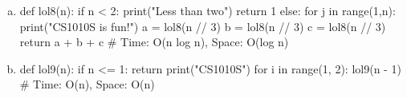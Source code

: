 \begin{enumerate}[(a)]
\item
\begin{python}
def lol8(n):
    if n < 2:
        print("Less than two")
        return 1
    else:
        for j in range(1,n):
            print("CS1010S is fun!")
        a = lol8(n // 3)
        b = lol8(n // 3)
        c = lol8(n // 3)
        return a + b + c
# Time: O(n log n), Space: O(log n)
\end{python}

\item
\begin{python}
def lol9(n):
    if n <= 1:
        return
    print("CS1010S")
    for i in range(1, 2):
        lol9(n - 1)
# Time: O(n), Space: O(n)
\end{python}
\end{enumerate}

\newpage

